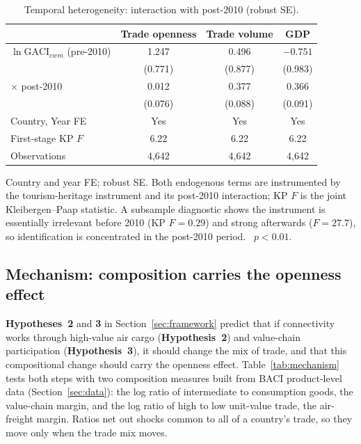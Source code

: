 \begin{table}[H]
\centering
\caption{Temporal heterogeneity: interaction with post-2010 (robust SE).}
\label{tab:temporal}
\begin{threeparttable}
\small
\begin{tabular}{lccc}
\toprule
 & Trade openness & Trade volume & GDP \\
\midrule
$\ln\mathrm{GACI}_{cwm}$ (pre-2010) & 1.247   & 0.496   & $-0.751$ \\
                        & (0.771) & (0.877) & (0.983) \\
$\times$ post-2010      & 0.012   & 0.377\sym{***} & 0.366\sym{***} \\
                        & (0.076) & (0.088) & (0.091) \\
\midrule
Country, Year FE        & Yes & Yes & Yes \\
First-stage KP $F$      & 6.22 & 6.22 & 6.22 \\
Observations            & 4{,}642 & 4{,}642 & 4{,}642 \\
\bottomrule
\end{tabular}
\begin{tablenotes}\footnotesize
\item Country and year FE; robust SE. Both endogenous terms are instrumented
by the tourism-heritage instrument and its post-2010 interaction; KP $F$ is
the joint Kleibergen--Paap statistic. A subsample diagnostic shows the
instrument is essentially irrelevant before 2010 (KP $F=0.29$) and strong
afterwards ($F=27.7$), so identification is concentrated in the post-2010
period.
\sym{***}~$p<0.01$.
\end{tablenotes}
\end{threeparttable}
\end{table}

\subsection{Mechanism: composition carries the openness effect}
\label{sec:mechanism}
\label{sec:mediation}
\textbf{Hypotheses~2} and \textbf{3} in Section~\ref{sec:framework} predict that if
connectivity works through high-value air cargo (\textbf{Hypothesis~2}) and
value-chain participation (\textbf{Hypothesis~3}), it should change the mix of trade,
and that this compositional change should carry the openness effect.
Table~\ref{tab:mechanism} tests both steps with two composition measures
built from BACI product-level data (Section~\ref{sec:data}): the log
ratio of intermediate to consumption goods, the value-chain margin, and
the log ratio of high to low unit-value trade, the air-freight margin.
Ratios net out shocks common to all of a country's trade, so they move
only when the trade mix moves.

